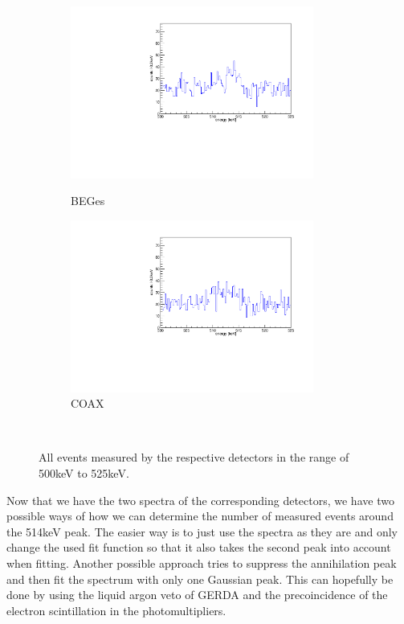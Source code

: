 \begin{figure}[t!]
\centering
\begin{subfigure}{.5\textwidth}
  \centering
	\includegraphics[width=80mm]{./Bilder/500525NoFilterBEGes.pdf}
  \label{fig:NoFilterBEGes}
  \caption{BEGes}
\end{subfigure}%
\begin{subfigure}{.5\textwidth}
  \centering
	\includegraphics[width=80mm]{./Bilder/500525NoFilterCOAX.pdf}
  \caption{COAX}
  \label{fig:NoFilterCOAX}
\end{subfigure}
    \\
	\vspace{0.5cm}
	\caption{All events measured by the respective detectors in the range of 500keV to 525keV.}
\end{figure}

Now that we have the two spectra of the corresponding detectors, we have two possible ways of how we can determine the number of measured events around the 514keV peak.
The easier way is to just use the spectra as they are and only change the used fit function so that it also takes the second peak into account when fitting.
Another possible approach tries to suppress the annihilation peak and then fit the spectrum with only one Gaussian peak.
This can hopefully be done by using the liquid argon veto of GERDA and the precoincidence of the electron scintillation in the photomultipliers. 
\\ 

